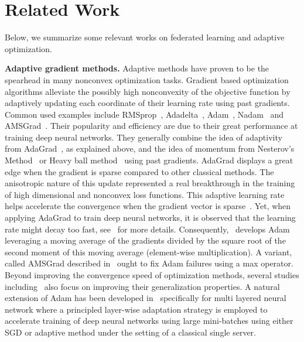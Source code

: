\documentclass[11pt]{article}
\begin{document}
\section{Related Work}\label{sec:related}

Below, we summarize some relevant works on federated learning and adaptive optimization.

\vspace{0.1in}
\noindent\textbf{Adaptive gradient methods.}
Adaptive methods have proven to be the spearhead in many nonconvex optimization tasks.
Gradient based optimization algorithms alleviate the possibly high nonconvexity of the objective function by adaptively updating each coordinate of their learning rate using past gradients. 
Common used examples include RMSprop~\citep{TH12}, Adadelta~\citep{Z12}, Adam~\citep{KB15}, Nadam~\citep{D16} and AMSGrad~\citep{reddi2019convergence}.
Their popularity and efficiency are due to their great performance at training deep neural networks.
They generally combine the idea of adaptivity from AdaGrad~\citep{DHS11,mcmahan2010adaptive}, as explained above, and the idea of momentum from Nesterov's Method~\citep{N04} or Heavy ball method~\citep{P64} using past gradients.
AdaGrad displays a great edge when the gradient is sparse compared to other classical methods.
The anisotropic nature of this update represented a real breakthrough in the training of high dimensional and nonconvex loss functions.
This adaptive learning rate helps accelerate the convergence when the gradient vector is sparse~\citep{DHS11}. Yet, when applying AdaGrad to train deep neural networks, it is observed that the learning rate might decay too fast, see~\citet{KB15} for more details.
Consequently,~\cite{KB15} develops Adam leveraging a moving average of the gradients divided by the square root of the second moment of this moving average (element-wise multiplication).
A variant, called AMSGrad described in~\citet{reddi2019convergence} ought to fix Adam failures using a max operator. Beyond improving the convergence speed of optimization methods, several studies including~\citet{zhou2020towards} also focus on improving their generalization properties.
A natural extension of Adam has been developed in~\citet{you2019large} specifically for multi layered neural network where a principled layer-wise adaptation strategy is employed to accelerate training of deep neural networks using large mini-batches using either SGD or adaptive method under the setting of a classical single server. 
\end{document}
